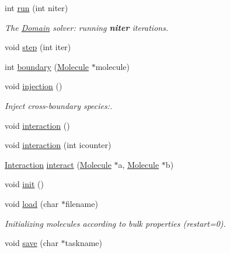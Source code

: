 \begin{CompactItemize}
\item 
int \hyperlink{classDomain_b5cc49686f4e35fb6deb30bdfeb906e0}{run} (int niter)
\begin{CompactList}\small\item\em The \hyperlink{classDomain}{Domain} solver: running {\bf niter} iterations. \item\end{CompactList}\item 
void \hyperlink{classDomain_9ca54d0631f30e5094f3843845821e5b}{step} (int iter)
\item 
int \hyperlink{classDomain_95f1918505199482138ce894f1f4e3ac}{boundary} (\hyperlink{classMolecule}{Molecule} $\ast$molecule)
\item 
void \hyperlink{classDomain_0ab601495bdb6dcb0b8001e6c23624d1}{injection} ()
\begin{CompactList}\small\item\em Inject cross-boundary species:. \item\end{CompactList}\item 
void \hyperlink{classDomain_567821d9c182227ce912ebae35793dd1}{interaction} ()
\item 
void \hyperlink{classDomain_2f93de66854d4fc26d4d326301e99214}{interaction} (int icounter)
\item 
\hyperlink{namespaceSpecies_aa897d386b20b57b719a044b5bb30a83}{Interaction} \hyperlink{classDomain_08b06bbed0954459ae2bb38c20c6a7a8}{interact} (\hyperlink{classMolecule}{Molecule} $\ast$a, \hyperlink{classMolecule}{Molecule} $\ast$b)
\item 
void \hyperlink{classDomain_12ba0b28c95d771109948d996ac25ef4}{init} ()
\item 
void \hyperlink{classDomain_8802986198af701f33acaccdedcfa2a2}{load} (char $\ast$filename)
\begin{CompactList}\small\item\em Initializing molecules according to bulk properties (restart=0). \item\end{CompactList}\item 
void \hyperlink{classDomain_e4ca51adef8bfebfa79963a486380749}{save} (char $\ast$taskname)
\end{CompactItemize}
